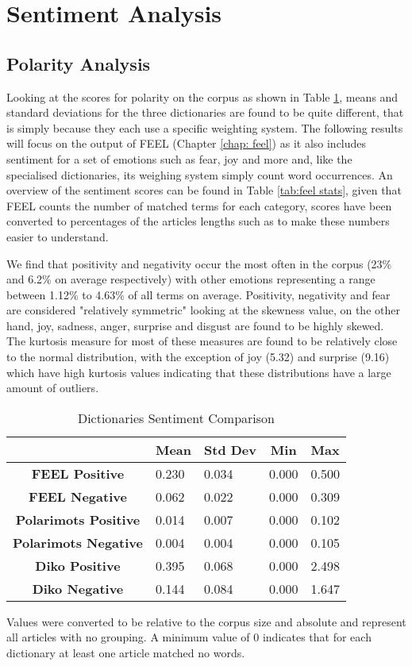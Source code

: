 \section{Sentiment Analysis}

\subsection{Polarity Analysis}

Looking at the scores for polarity on the corpus as shown in Table \ref{tab:dict stats}, means and standard deviations for the three dictionaries are found to be quite different, that is simply because they each use a specific weighting system. The following results will focus on the output of FEEL (Chapter \ref{chap: feel}) as it also includes sentiment for a set of emotions such as fear, joy and more and, like the specialised dictionaries, its weighing system simply count word occurrences. An overview of the sentiment scores can be found in Table \ref{tab:feel stats}, given that FEEL counts the number of matched terms for each category, scores have been converted to percentages of the articles lengths such as to make these numbers easier to understand. 

We find that positivity and negativity occur the most often in the corpus (23\% and 6.2\% on average respectively) with other emotions representing a range between 1.12\% to 4.63\% of all terms on average. Positivity, negativity and fear are considered "relatively symmetric" looking at the skewness value, on the other hand, joy, sadness, anger, surprise and disgust are found to be highly skewed. The kurtosis measure for most of these measures are found to be relatively close to the normal distribution, with the exception of joy (5.32) and surprise (9.16) which have high kurtosis values indicating that these distributions have a large amount of outliers.

\begin{table}[H]
\centering
\begin{tabular}{@{}cllll@{}}
\toprule
 & \multicolumn{1}{c}{\textbf{Mean}} & \multicolumn{1}{c}{\textbf{Std Dev}} & \multicolumn{1}{c}{\textbf{Min}} & \multicolumn{1}{c}{\textbf{Max}} \\ \midrule
\textbf{FEEL Positive} & 0.230 & 0.034 & 0.000 & 0.500 \\
\textbf{FEEL Negative} & 0.062 & 0.022 & 0.000 & 0.309 \\
\textbf{Polarimots Positive} & 0.014 & 0.007 & 0.000 & 0.102 \\
\textbf{Polarimots Negative} & 0.004 & 0.004 & 0.000 & 0.105 \\
\textbf{Diko Positive} & 0.395 & 0.068 & 0.000 & 2.498 \\
\textbf{Diko Negative} & 0.144 & 0.084 & 0.000 & 1.647 \\ \bottomrule
\end{tabular}
\caption{Dictionaries Sentiment Comparison}
Values were converted to be relative to the corpus size and absolute and represent all articles with no grouping. A minimum value of 0 indicates that for each dictionary at least one article matched no words.
\label{tab:dict stats}
\end{table}

